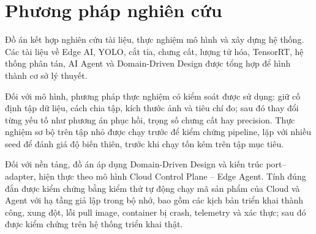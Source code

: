 \section{Phương pháp nghiên cứu}

Đồ án kết hợp nghiên cứu tài liệu, thực nghiệm mô hình và xây dựng hệ thống. Các
tài liệu về Edge AI, YOLO, cắt tỉa, chưng cất, lượng tử hóa, TensorRT, hệ thống
phân tán, AI Agent và Domain-Driven Design được tổng hợp để hình thành cơ sở lý
thuyết.

Đối với mô hình, phương pháp thực nghiệm có kiểm soát được sử dụng: giữ cố định
tập dữ liệu, cách chia tập, kích thước ảnh và tiêu chí đo; sau đó thay đổi từng
yếu tố như phương án phục hồi, trọng số chưng cất hay precision. Thực nghiệm sơ
bộ trên tập nhỏ được chạy trước để kiểm chứng pipeline, lặp với nhiều seed để
đánh giá độ biến thiên, trước khi chạy tốn kém trên tập mục tiêu.

Đối với nền tảng, đồ án áp dụng Domain-Driven Design và kiến trúc port--adapter,
hiện thực theo mô hình Cloud Control Plane -- Edge Agent. Tính đúng đắn được kiểm
chứng bằng kiểm thử tự động chạy mã sản phẩm của Cloud và Agent với hạ tầng giả
lập trong bộ nhớ, bao gồm các kịch bản triển khai thành công, xung đột, lỗi pull
image, container bị crash, telemetry và xác thực; sau đó được kiểm chứng trên hệ
thống triển khai thật.
